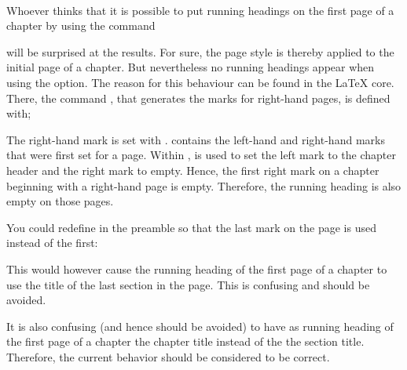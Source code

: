 \begin{Declaration}
  \\
\end{Declaration}
%
%
\begin{Explain}
  Whoever thinks that it is possible to put running headings on the
  first page of a chapter by using the command
\begin{lstcode}
  \renewcommand*{\chapterpagestyle}{headings}
\end{lstcode}
  will be surprised at the results.
  For sure, the page style  is thereby applied to the
  initial page of a chapter. But nevertheless no running headings appear
  when using the  option.
  The reason for this behaviour can be found in the {\LaTeX}
  core. There, the command , that generates the marks
  for right-hand pages, is defined with;
\begin{lstcode}
  \let\@rightmark\@secondoftwo
  \def\rightmark{\expandafter\@rightmark
    \firstmark\@empty\@empty}
\end{lstcode}
  The right-hand mark is set with . 
  contains the  left-hand  and right-hand  marks that were first set
  for a page. Within ,  is used to set
  the left mark to the chapter header and the right mark to empty.
  Hence, the first right
  mark on  a chapter beginning with a right-hand page is empty. Therefore,
  the running heading is also empty on those pages.

  You could redefine  in the preamble so that the
  last mark on the page is used instead of the first:
\begin{lstcode}
  \makeatletter
  \renewcommand*{\rightmark}{%
    \expandafter\@rightmark\botmark\@empty\@empty}
  \makeatother
\end{lstcode}
  This would however cause the running heading of the first page of a
  chapter to use the title of the last section in the page. This is
  confusing and should be avoided.

  It is also confusing (and hence should be avoided) to have as
  running heading of the first page of a chapter the chapter title
  instead of the the section title. Therefore, the current behavior
  should be considered to be correct.
\end{Explain}
%



